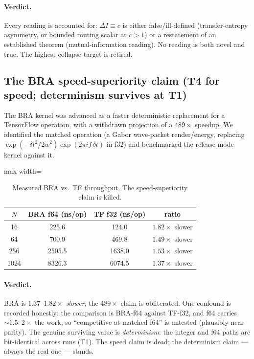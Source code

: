 \documentclass[11pt]{article}
\newcommand{\DI}{\Delta I}
\newcommand{\tier}[1]{\textsf{#1}}
\begin{document}
\paragraph{Verdict.} Every reading is accounted for: $\DI\equiv c$ is either
false/ill-defined (transfer-entropy asymmetry, or bounded routing scalar at $c>1$) or a
restatement of an established theorem (mutual-information reading). No reading is both
novel and true. The highest-collapse target is retired.

\subsection{The BRA speed-superiority claim (T4 for speed; determinism survives at T1)}
\label{sec:q2}

The BRA kernel was advanced as a faster deterministic replacement for a TensorFlow
operation, with a withdrawn projection of a $489\times$ speedup. We identified the
matched operation (a Gabor wave-packet render/energy, replacing
$\exp(-\delta t^2/2w^2)\exp(2\pi i f\,\delta t)$ in f32) and benchmarked the release-mode
kernel against it.

\begin{table}[h]
\centering
\begin{adjustbox}{max width=\linewidth}\begin{tabular}{cccc}
\toprule
$N$ & BRA f64 (ns/op) & TF f32 (ns/op) & ratio\\
\midrule
16 & 225.6 & 124.0 & $1.82\times$ slower\\
64 & 700.9 & 469.8 & $1.49\times$ slower\\
256 & 2505.5 & 1638.0 & $1.53\times$ slower\\
1024 & 8326.3 & 6074.5 & $1.37\times$ slower\\
\bottomrule
\end{tabular}\end{adjustbox}
\caption{Measured BRA vs.\ TF throughput. The speed-superiority claim is killed.}
\label{tab:q2}
\end{table}

\paragraph{Verdict.} BRA is $1.37$--$1.82\times$ \emph{slower}; the $489\times$ claim is
obliterated. One confound is recorded honestly: the comparison is BRA-f64 against
TF-f32, and f64 carries $\sim1.5$--$2\times$ the work, so ``competitive at matched f64''
is untested (plausibly near parity). The genuine surviving value is \emph{determinism}:
the integer and f64 paths are bit-identical across runs (\tier{T1}). The speed claim is
dead; the determinism claim --- always the real one --- stands.
\end{document}

